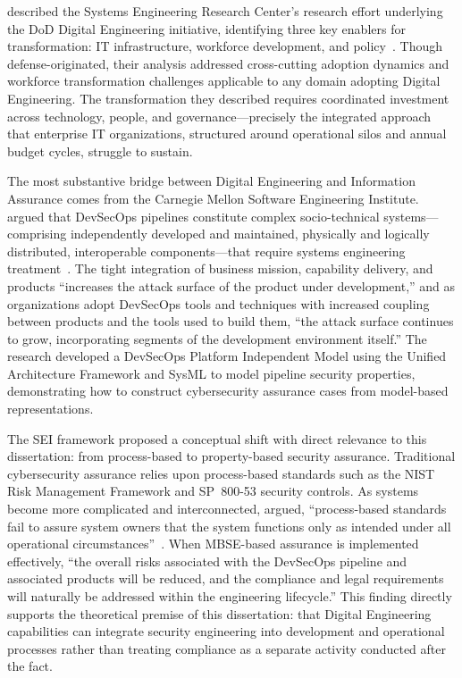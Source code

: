 \citeauthor{Bone_Blackburn_2019} described the Systems Engineering Research Center's research effort underlying the DoD Digital Engineering initiative, identifying three key enablers for transformation: IT infrastructure, workforce development, and policy~\parencite{Bone_Blackburn_2019}. Though defense-originated, their analysis addressed cross-cutting adoption dynamics and workforce transformation challenges applicable to any domain adopting Digital Engineering. The transformation they described requires coordinated investment across technology, people, and governance---precisely the integrated approach that enterprise IT organizations, structured around operational silos and annual budget cycles, struggle to sustain.

The most substantive bridge between Digital Engineering and Information Assurance comes from the Carnegie Mellon Software Engineering Institute. \citeauthor{CMU_SEI_DevSecOps_2023} argued that DevSecOps pipelines constitute complex socio-technical systems---comprising independently developed and maintained, physically and logically distributed, interoperable components---that require systems engineering treatment~\parencite{CMU_SEI_DevSecOps_2023}. The tight integration of business mission, capability delivery, and products ``increases the attack surface of the product under development,'' and as organizations adopt DevSecOps tools and techniques with increased coupling between products and the tools used to build them, ``the attack surface continues to grow, incorporating segments of the development environment itself.'' The research developed a DevSecOps Platform Independent Model using the Unified Architecture Framework and SysML to model pipeline security properties, demonstrating how to construct cybersecurity assurance cases from model-based representations.

The SEI framework proposed a conceptual shift with direct relevance to this dissertation: from process-based to property-based security assurance. Traditional cybersecurity assurance relies upon process-based standards such as the NIST Risk Management Framework and SP~800-53 security controls. As systems become more complicated and interconnected, \citeauthor{CMU_SEI_DevSecOps_2023} argued, ``process-based standards fail to assure system owners that the system functions only as intended under all operational circumstances''~\parencite{CMU_SEI_DevSecOps_2023}. When MBSE-based assurance is implemented effectively, ``the overall risks associated with the DevSecOps pipeline and associated products will be reduced, and the compliance and legal requirements will naturally be addressed within the engineering lifecycle.'' This finding directly supports the theoretical premise of this dissertation: that Digital Engineering capabilities can integrate security engineering into development and operational processes rather than treating compliance as a separate activity conducted after the fact.

